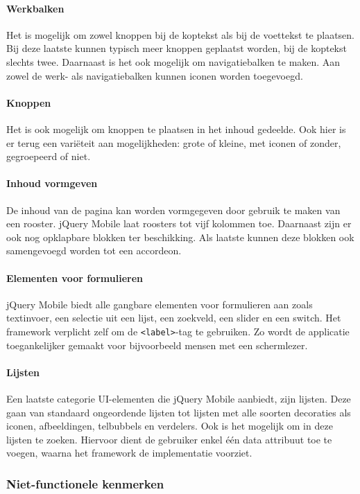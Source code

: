 \paragraph{Werkbalken}
Het is mogelijk om zowel knoppen bij de koptekst als bij de voettekst te plaatsen. Bij deze laatste kunnen typisch meer knoppen geplaatst worden, bij de koptekst slechts twee. Daarnaast is het ook mogelijk om navigatiebalken te maken. Aan zowel de werk- als navigatiebalken kunnen iconen worden toegevoegd.

\paragraph{Knoppen}
Het is ook mogelijk om knoppen te plaatsen in het inhoud gedeelde. Ook hier is er terug een variëteit aan mogelijkheden: grote of kleine, met iconen of zonder, gegroepeerd of niet. 

\paragraph{Inhoud vormgeven}
De inhoud van de pagina kan worden vormgegeven door gebruik te maken van een rooster. jQuery Mobile laat roosters tot vijf kolommen toe. Daarnaast zijn er ook nog opklapbare blokken ter beschikking. Als laatste kunnen deze blokken ook samengevoegd worden tot een accordeon. 

\paragraph{Elementen voor formulieren}
jQuery Mobile biedt alle gangbare elementen voor formulieren aan zoals textinvoer, een selectie uit een lijst, een zoekveld, een slider en een switch. Het framework verplicht zelf om de \texttt{<label>}-tag te gebruiken. Zo wordt de applicatie toegankelijker gemaakt voor bijvoorbeeld mensen met een schermlezer.

\paragraph{Lijsten}
Een laatste categorie UI-elementen die jQuery Mobile aanbiedt, zijn lijsten. Deze gaan van standaard ongeordende lijsten tot lijsten met alle soorten decoraties als iconen, afbeeldingen, telbubbels en verdelers. Ook is het mogelijk om in deze lijsten te zoeken. Hiervoor dient de gebruiker enkel één data attribuut toe te voegen, waarna het framework de implementatie voorziet. 

\subsubsection{Niet-functionele kenmerken}
